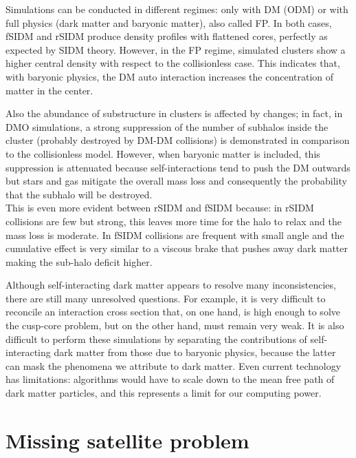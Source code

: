 Simulations can be conducted in different regimes: only with DM (ODM) or with full physics (dark matter and baryonic matter), also called FP.
In both cases, fSIDM and rSIDM produce density profiles with flattened cores, perfectly as expected by SIDM theory. However, in the FP regime, simulated clusters show a higher central density with respect to the collisionless case. This indicates that, with baryonic physics, the DM auto interaction increases the concentration of matter in the center. 

Also the abundance of substructure in clusters is affected by changes; in fact, in DMO simulations, a strong suppression of the number of subhalos inside the cluster (probably destroyed by DM-DM collisions) is demonstrated in comparison to the collisionless model. However, when baryonic matter is included, this suppression is attenuated because self-interactions tend to push the DM outwards but stars and gas mitigate the overall mass loss and consequently the probability that the subhalo will be destroyed.\\ This is even more evident between rSIDM and fSIDM because: in rSIDM collisions are few but strong, this leaves more time for the halo to relax and the mass loss is moderate. In fSIDM collisions are frequent with small angle and the cumulative effect is very similar to a viscous brake that pushes away dark matter making the sub-halo deficit higher. 

Although self-interacting dark matter appears to resolve many inconsistencies, there are still many unresolved questions. For example, it is very difficult to reconcile an interaction cross section that, on one hand, is high enough to solve the cusp-core problem, but on the other hand, must remain very weak.
It is also difficult to perform these simulations by separating the contributions of self-interacting dark matter from those due to baryonic physics, because the latter can mask the phenomena we attribute to dark matter.
Even current technology has limitations: algorithms would have to scale down to the mean free path of dark matter particles, and this represents a limit for our computing power.


\section{Missing satellite problem}

